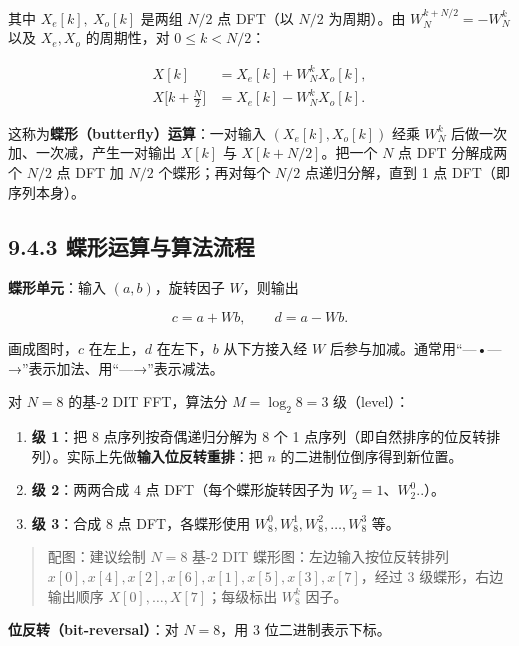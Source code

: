 其中 \(X_e[k],\ X_o[k]\) 是两组 \(N/2\) 点 DFT（以 \(N/2\) 为周期）。由
\(W_N^{k+N/2}=-W_N^k\) 以及 \(X_e,X_o\) 的周期性，对 \(0\le k<N/2\)：

\[
\boxed{
\begin{aligned}
X[k] &= X_e[k]+W_N^k X_o[k],\\
X\bigl[k+\tfrac N2\bigr] &= X_e[k]-W_N^k X_o[k].
\end{aligned}}
\]

这称为\textbf{蝶形（butterfly）运算}：一对输入 \((X_e[k],X_o[k])\) 经乘
\(W_N^k\) 后做一次加、一次减，产生一对输出 \(X[k]\) 与
\(X[k+N/2]\)。把一个 \(N\) 点 DFT 分解成两个 \(N/2\) 点 DFT 加 \(N/2\)
个蝶形；再对每个 \(N/2\) 点递归分解，直到 1 点 DFT（即序列本身）。

\subsection{9.4.3
蝶形运算与算法流程}\label{ux8776ux5f62ux8fd0ux7b97ux4e0eux7b97ux6cd5ux6d41ux7a0b}

\textbf{蝶形单元}：输入 \((a,b)\)，旋转因子 \(W\)，则输出

\[
c = a + W b,\qquad d = a - W b .
\]

画成图时，\(c\) 在左上，\(d\) 在左下，\(b\) 从下方接入经 \(W\)
后参与加减。通常用``---•---→''表示加法、用``---→''表示减法。

对 \(N=8\) 的基-2 DIT FFT，算法分 \(M=\log_2 8=3\) 级（level）：

\begin{enumerate}
\def\labelenumi{\arabic{enumi}.}
\tightlist
\item
  \textbf{级 1}：把 8 点序列按奇偶递归分解为 8 个 1
  点序列（即自然排序的位反转排列）。实际上先做\textbf{输入位反转重排}：把
  \(n\) 的二进制位倒序得到新位置。
\item
  \textbf{级 2}：两两合成 4 点 DFT（每个蝶形旋转因子为
  \(W_2=1\)、\(W_2^0..\)）。
\item
  \textbf{级 3}：合成 8 点 DFT，各蝶形使用
  \(W_8^0,W_8^1,W_8^2,\ldots,W_8^3\) 等。
\end{enumerate}

\begin{quote}
配图：建议绘制 \(N=8\) 基-2 DIT 蝶形图：左边输入按位反转排列
\(x[0],x[4],x[2],x[6],x[1],x[5],x[3],x[7]\)，经过 3 级蝶形，右边输出顺序
\(X[0],\ldots,X[7]\)；每级标出 \(W_8^k\) 因子。
\end{quote}

\textbf{位反转（bit-reversal）}：对 \(N=8\)，用 3 位二进制表示下标。

